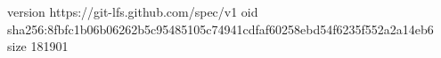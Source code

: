 version https://git-lfs.github.com/spec/v1
oid sha256:8fbfc1b06b06262b5c95485105c74941cdfaf60258ebd54f6235f552a2a14eb6
size 181901
